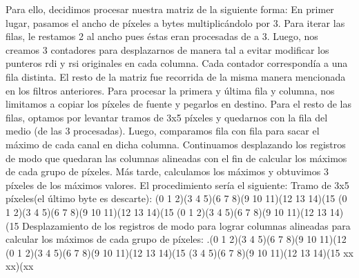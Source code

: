 \documentclass[10pt, a4paper]{article}
\begin{document}
\begin{itemize}
Para ello, decidimos procesar nuestra matriz de la siguiente forma:\newline
En primer lugar, pasamos el ancho de píxeles a bytes multiplicándolo por 3. Para iterar las filas, le restamos 2 al ancho pues éstas eran procesadas de a 3. Luego, nos creamos 3 contadores para desplazarnos de manera tal a evitar modificar los punteros rdi y rsi originales en cada columna. Cada contador correspondía a una fila distinta. El resto de la matriz fue recorrida de la misma manera mencionada en los filtros anteriores.\newline
Para procesar la primera y última fila y columna, nos limitamos a copiar los píxeles de fuente y pegarlos en destino. Para el resto de las filas, optamos por levantar tramos de 3x5 píxeles y quedarnos con la fila del medio (de las 3 procesadas). Luego, comparamos fila con fila para sacar el máximo de cada canal en dicha columna. Continuamos desplazando los registros de modo que quedaran las columnas alineadas con el fin de calcular los máximos de cada grupo de píxeles. Más tarde, calculamos los máximos y obtuvimos 3 píxeles de los máximos valores. El procedimiento sería el siguiente:\newline
\newline
Tramo de 3x5 píxeles(el último byte es descarte):\newline
		(0 1 2)(3 4 5)(6 7 8)(9 10 11)(12 13 14)(15\newline
		(0 1 2)(3 4 5)(6 7 8)(9 10 11)(12 13 14)(15\newline
		(0 1 2)(3 4 5)(6 7 8)(9 10 11)(12 13 14)(15\newline
\newline
Desplazamiento de los registros de modo para lograr columnas alineadas para calcular los máximos de cada grupo de píxeles:\newline
		.\hspace{2cm}(0 1 2)(3  4  5)(6  7  8)(9 10 11)(12\newline
		(0 1 2)(3 4 5)(6  7  8)(9 10 11)(12 13 14)(15\newline
		(3 4 5)(6 7 8)(9 10 11)(12 13 14)(15 xx xx)(xx\newline
		

\end{itemize}
\end{document}
